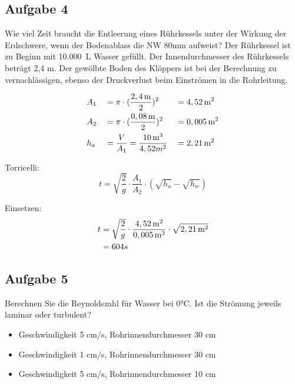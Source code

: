 \documentclass[a4paper,11pt]{article}
\begin{document}
\pagebreak
\subsection*{Aufgabe 4}
Wie viel Zeit braucht die Entleerung eines Rührkessels unter der Wirkung der \mbox{Erdschwere}, wenn der Bodenablass die NW 80mm aufweist? Der Rührkessel ist zu Beginn mit \mbox{10.000 L} Wasser gefüllt. Der Innendurchmesser des Rührkessels beträgt 2,4 m. Der gewölbte Boden des Klöppers ist bei der Berechnung zu vernachlässigen, ebenso der Druckverlust beim Einströmen in die Rohrleitung.
\ppbig
 


\begin{align*}
&A_1 &&= \pi \cdot (\frac{2,4\mskip3mu \text{m}}{2})^2 &&= 4,52\mskip3mu \text{m}^2 \\
&A_2 &&= \pi \cdot (\frac{0,08\mskip3mu \text{m}}{2})^2 &&= 0,005\mskip3mu \text{m}^2 \\
&h_a &&= \frac{V}{A_1} = \frac{10\mskip3mu \text{m}^3}{4,52m^2} &&= 2,21\mskip3mu \text{m}^2 
\end{align*}

\ppbig
Torricelli:
\begin{equation}
t = \sqrt{\frac{2}{g}} \cdot \frac{A_1}{A_2} \cdot (\sqrt{h_a} - \sqrt{h_w})
\end{equation}

Einsetzen:
\begin{align*}
t &= \sqrt{\frac{2}{g}} \cdot \frac{4,52\mskip3mu \text{m}^2}{0,005\mskip3mu \text{m}^2} \cdot \sqrt{2,21\mskip3mu \text{m}^2} \\
&= 604s
\end{align*}







\pagebreak
\subsection*{Aufgabe 5}
Berechnen Sie die Reynoldszahl für Wasser bei 0°C. Ist die Strömung jeweils laminar oder turbulent?
\begin{itemize}
       \item[a.] Geschwindigkeit 5 cm/s, Rohrinnendurchmesser 30 cm
       \item[b.] Geschwindigkeit 1 cm/s, Rohrinnendurchmesser 30 cm
       \item[c.] Geschwindigkeit 5 cm/s, Rohrinnendurchmesser 10 cm
\end{itemize}
\end{document}
